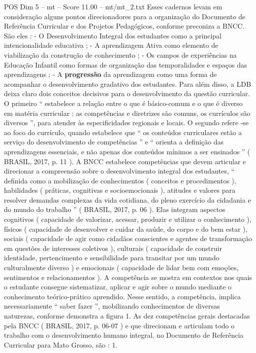 \begin{textsample}{POS Dim 5 – mt – Score 11.00 – mt/mt\_2.txt}
Esses cadernos levam em consideração alguns pontos direcionadores para a organização do Documento de Referência Curricular e dos Projetos Pedagógicos, conforme preconiza a BNCC.
São eles : - O Desenvolvimento Integral dos estudantes como a principal intencionalidade educativa ; - A aprendizagem Ativa como elemento de viabilização da construção de conhecimento ; - Os campos de experiências na Educação Infantil como formas de organização das temporalidades e espaços das aprendizagens ; - A \textbf{progressão} da aprendizagem como uma forma de acompanhar o desenvolvimento gradativo dos estudantes.
Para além disso, a LDB deixa claro dois conceitos decisivos para o desenvolvimento da questão curricular.
O primeiro “ estabelece a relação entre o que é básico-comum e o que é diverso em matéria curricular : as competências e diretrizes são comuns, os currículos são diversos ”, para atender às especificidades regionais e locais.
O segundo refere -se ao foco do currículo, quando estabelece que “ os conteúdos curriculares estão a serviço do desenvolvimento de competências ” e “ orienta a definição das aprendizagens essenciais, e não apenas dos conteúdos mínimos a ser ensinados ” ( BRASIL, 2017, p. 11 ).
A BNCC estabelece competências que devem articular e direcionar a compreensão sobre o desenvolvimento integral dos estudantes, “ definida como a mobilização de conhecimentos ( conceitos e procedimentos ), habilidades ( práticas, cognitivas e socioemocionais ), atitudes e valores para resolver demandas complexas da vida cotidiana, do pleno exercício da cidadania e do mundo do trabalho ” ( BRASIL, 2017, p. 06 ).
Elas integram aspectos cognitivos ( capacidade de valorizar, acessar, produzir e utilizar o conhecimento ), físicos ( capacidade de desenvolver e cuidar da saúde, do corpo e do bem estar ), sociais ( capacidade de agir como cidadãos conscientes e agentes de transformação em questões de interesses coletivos ), culturais ( capacidade de construir identidade, pertencimento e sensibilidade para transitar por um mundo culturalmente diverso ) e emocionais ( capacidade de lidar bem com emoções, sentimentos e relacionamentos ).
A competência se mostra em contextos nos quais o estudante consegue sistematizar, aplicar e agir sobre o mundo mediante o conhecimento teórico-prático aprendido.
Nesse sentido, a competência, implica necessariamente “ saber fazer ”, mobilizando conhecimentos de diversas naturezas, conforme demonstra a figura 1.
As dez competências gerais destacadas pela BNCC ( BRASIL, 2017, p. 06-07 ) e que direcionam e articulam todo o trabalho com o desenvolvimento humano integral, no Documento de Referência Curricular para Mato Grosso, são : 1.

\end{textsample}
